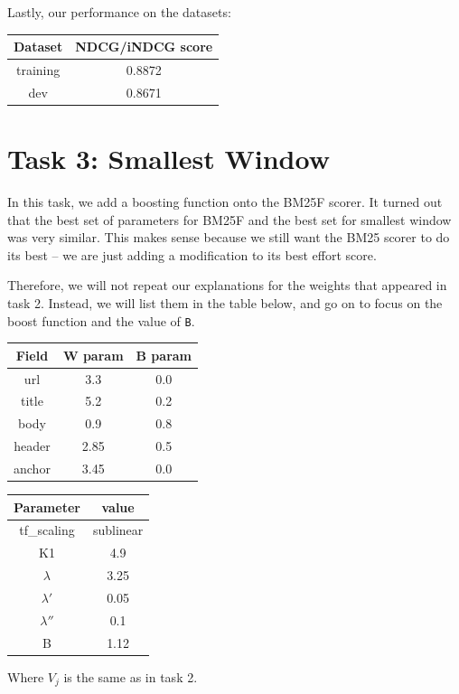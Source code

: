 \documentclass[10pt,twocolumn]{article}
\begin{document}
Lastly, our performance on the datasets:
\begin{table}[H]
\centering
\begin{tabular}{|c|c|}
\hline
Dataset & NDCG/iNDCG score \\\hline
training & 0.8872\\\hline
dev & 0.8671\\\hline
\end{tabular}
\end{table}
\section*{Task 3: Smallest Window}
In this task, we add a boosting function onto the BM25F scorer. It turned out that the best set of parameters for BM25F and the best set for smallest window was very similar. This makes sense because we still want the BM25 scorer to do its best -- we are just adding a modification to its best effort score. 

Therefore, we will not repeat our explanations for the weights that appeared in task 2. Instead, we will list them in the table below, and go on to focus on the boost function and the value of \texttt{B}.
\begin{table}[H]
\centering
\begin{tabular}{|c|c|c|}
\hline
Field & W param & B param\\\hline
url & 3.3 & 0.0\\\hline
title & 5.2 & 0.2\\\hline
body & 0.9 & 0.8\\\hline
header & 2.85 & 0.5 \\\hline
anchor & 3.45 & 0.0\\\hline
\end{tabular}
\end{table}
\begin{table}[H]
\centering
\begin{tabular}{|c|c|}
\hline
Parameter & value\\\hline
tf\_scaling & sublinear\\\hline
K1 & 4.9\\\hline
$\lambda$ & 3.25\\\hline
$\lambda'$ & 0.05\\\hline
$\lambda''$ & 0.1\\\hline
B & 1.12\\\hline
\end{tabular}
\end{table}
Where $V_j$ is the same as in task 2.
\end{document}
